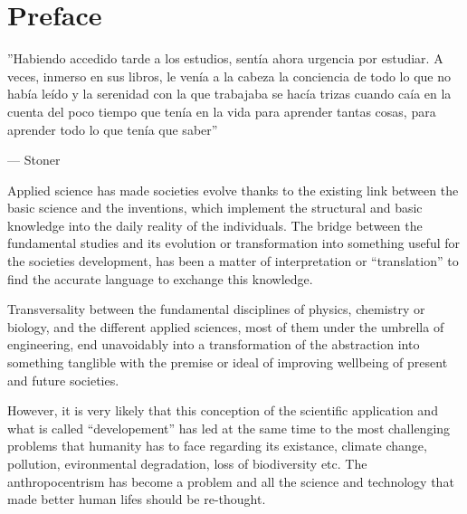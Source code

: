 \chapter*{Preface\label{cha:preface}}

\epigraphfontsize{\small\itshape}
\epigraph{''Habiendo accedido tarde a los estudios, sentía ahora urgencia por estudiar. A veces, inmerso en sus libros, le venía a la cabeza la conciencia de todo lo que no había leído y la serenidad con la que trabajaba se hacía trizas cuando caía en la cuenta del poco tiempo que tenía en la vida para aprender tantas cosas, para aprender todo lo que tenía que saber''}{--- \textup{Stoner}}

Applied science has made societies evolve thanks to the existing link between the basic science and the inventions, which implement the structural and basic knowledge into the daily reality of the individuals. The bridge between the fundamental studies and its evolution or transformation into something useful for the societies development, has been a matter of interpretation or ``translation'' to find the accurate language to exchange this knowledge.


Transversality between the fundamental disciplines of physics, chemistry or biology, and the different applied sciences, most of them under the umbrella of engineering, end unavoidably into a transformation of the abstraction into something tanglible with the premise or ideal of improving wellbeing of present and future societies.


However, it is very likely that this conception of the scientific application and what is called ``developement'' has led at the same time to the most challenging problems that humanity has to face regarding its existance, climate change, pollution, evironmental degradation, loss of biodiversity etc. The anthropocentrism has become a problem and all the science and technology that made better human lifes should be re-thought.


